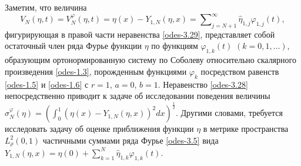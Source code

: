 Заметим,  что величина
\begin{equation}\label{odes-3.30}
 V_N(\eta,t)=V_N^\varphi(\eta,t)=\eta(x)- Y_{1,N}(\eta,x)
=\sum\nolimits_{j=N+1}^\infty \hat \eta_{1,j}\varphi_{1,j}(t),
\end{equation}
  фигурирующая в правой части неравенства \eqref{odes-3.29}, представляет собой остаточный член ряда Фурье функции $\eta$ по функциям $\varphi_{1,k}(t)$ $(k=0,1,\ldots)$, образующим ортонормированную систему по Соболеву относительно скалярного произведения \eqref{odes-1.3}, порожденным  функциями $\varphi_k$ посредством равенств \eqref{odes-1.5} и \eqref{odes-1.6} с $r=1$, $a=0$, $b=1$.  Неравенство \eqref{odes-3.28} непосредственно приводит к  задаче об исследовании поведения величины $\sigma_N^\varphi(\eta)=(\int_{0}^1(\eta(x)- Y_{1,N}(\eta,x))^2 dx)^\frac12$.
Другими словами, требуется исследовать задачу об оценке приближения функции $\eta$ в метрике пространства $L^2_{\rho}(0,1)$ частичными суммами   ряда Фурье \eqref{odes-3.5} вида $Y_{1,N}(\eta,x)= \eta(0)+ \sum\nolimits_{k=1}^N \hat \eta_{1,k}\varphi_{1,k}(t).$

